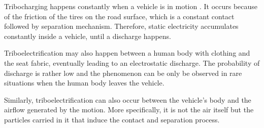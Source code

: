 Tribocharging happens constantly when a vehicle is in motion \cite{generationESDautomotive}.
It occurs because of the friction of the tires on the road surface, which is a constant contact followed by separation mechanism.
Therefore, static electricity accumulates constantly inside a vehicle, until a discharge happens.

Triboelectrification may also happen between a human body with clothing and the seat fabric, eventually leading to an electrostatic discharge.
The probability of discharge is rather low \cite{generationESDautomotive} and the phenomenon can be only be observed in rare situations when the human body leaves the vehicle.

Similarly, triboelectrification can also occur between the vehicle's body and the airflow generated by the motion.
More specifically, it is not the air itself but the particles carried in it that induce the contact and separation process.
